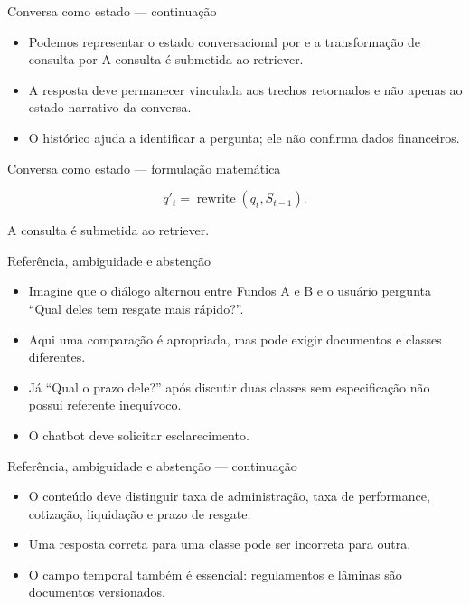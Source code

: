 \documentclass[10pt,aspectratio=169]{beamer}
\begin{document}
\begin{frame}[t]{Conversa como estado — continuação}
\small
\begin{itemize}
\item Podemos representar o estado conversacional por e a transformação de consulta por A consulta é submetida ao retriever.
\item A resposta deve permanecer vinculada aos trechos retornados e não apenas ao estado narrativo da conversa.
\item O histórico ajuda a identificar a pergunta; ele não confirma dados financeiros.
\end{itemize}
\end{frame}

\begin{frame}[t]{Conversa como estado — formulação matemática}
\small
\vspace{3mm}\begin{center}\small\[q'_t=\operatorname{rewrite}(q_t,S_{t-1}).\]\end{center}
\vspace{3mm}\small A consulta é submetida ao retriever.
\end{frame}

\begin{frame}[t]{Referência, ambiguidade e abstenção}
\small
\begin{itemize}
\item Imagine que o diálogo alternou entre Fundos A e B e o usuário pergunta ``Qual deles tem resgate mais rápido?''.
\item Aqui uma comparação é apropriada, mas pode exigir documentos e classes diferentes.
\item Já ``Qual o prazo dele?'' após discutir duas classes sem especificação não possui referente inequívoco.
\item O chatbot deve solicitar esclarecimento.
\end{itemize}
\end{frame}

\begin{frame}[t]{Referência, ambiguidade e abstenção — continuação}
\small
\begin{itemize}
\item O conteúdo deve distinguir taxa de administração, taxa de performance, cotização, liquidação e prazo de resgate.
\item Uma resposta correta para uma classe pode ser incorreta para outra.
\item O campo temporal também é essencial: regulamentos e lâminas são documentos versionados.
\end{itemize}
\end{frame}
\end{document}
